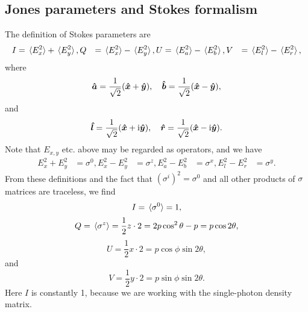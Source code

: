 \documentclass[hyperref, a4paper]{article}
\newcommand*{\ii}{\mathrm{i}}
\def\\{}%
\begin{document}
\subsection{Jones parameters and Stokes formalism}

The definition of Stokes parameters are 
\begin{equation}
    \begin{aligned}
        I &= \expval*{E_x^2} + \expval*{E_y^2}, \\
        Q &= \expval*{E_x^2} - \expval*{E_y^2}, \\
        U &= \expval*{E_a^2} - \expval*{E_b^2}, \\
        V &= \expval*{E_l^2} - \expval*{E_r^2},
    \end{aligned}
\end{equation}
where 
\begin{equation}
    \vu*{a} = \frac{1}{\sqrt{2}} (\vu*{x} + \vu*{y}), \quad 
    \vu*{b} = \frac{1}{\sqrt{2}} (\vu*{x} - \vu*{y}),
\end{equation}
and 
\begin{equation}
    \vu*{l} = \frac{1}{\sqrt{2}} (\vu*{x} + \ii \vu*{y}), \quad 
    \vu*{r} = \frac{1}{\sqrt{2}} (\vu*{x} - \ii \vu*{y}).
\end{equation}
Note that $E_{x, y}$ etc. above may be regarded as operators, 
and we have 
\begin{equation}
    \begin{aligned}
        E_x^2 + E_y^2 &= \sigma^0, \\
        E_x^2 - E_y^2 &= \sigma^z, \\
        E_a^2 - E_b^2 &= \sigma^x, \\
        E_l^2 - E_r^2 &= \sigma^y.
    \end{aligned}
\end{equation}
From these definitions
and the fact that $(\sigma^i)^2 = \sigma^0$ and 
all other products of $\sigma$ matrices are traceless, 
we find 
\begin{equation}
    I = \expval*{\sigma^0} = 1, 
\end{equation}
\begin{equation}
    Q = \expval*{\sigma^z} = \frac{1}{2} z \cdot 2 = 2 p \cos^2 \theta - p = p \cos 2 \theta,
\end{equation}
\begin{equation}
    U = \frac{1}{2} x \cdot 2 = p \cos \phi \sin 2 \theta,
\end{equation}
and 
\begin{equation}
    V = \frac{1}{2} y \cdot 2 = p \sin \phi \sin 2 \theta.
\end{equation}
Here $I$ is constantly 1, 
because we are working with the single-photon density matrix.
\end{document}

